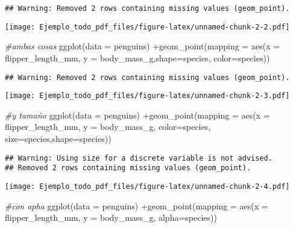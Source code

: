 \documentclass[
]{article}
\newenvironment{Shaded}{\begin{snugshade}}{\end{snugshade}}
\newcommand{\AttributeTok}[1]{\textcolor[rgb]{0.77,0.63,0.00}{#1}}
\newcommand{\CommentTok}[1]{\textcolor[rgb]{0.56,0.35,0.01}{\textit{#1}}}
\newcommand{\FunctionTok}[1]{\textcolor[rgb]{0.00,0.00,0.00}{#1}}
\newcommand{\NormalTok}[1]{#1}
\newcommand{\SpecialCharTok}[1]{\textcolor[rgb]{0.00,0.00,0.00}{#1}}
\begin{document}
\begin{verbatim}
## Warning: Removed 2 rows containing missing values (geom_point).
\end{verbatim}

\texttt{[image: Ejemplo\_todo\_pdf\_files/figure-latex/unnamed-chunk-2-2.pdf]}

\begin{Shaded}
\begin{Highlighting}[]
\CommentTok{\#ambas cosas}
\FunctionTok{ggplot}\NormalTok{(}\AttributeTok{data =}\NormalTok{ penguins) }\SpecialCharTok{+}\FunctionTok{geom\_point}\NormalTok{(}\AttributeTok{mapping =} \FunctionTok{aes}\NormalTok{(}\AttributeTok{x =}\NormalTok{ flipper\_length\_mm, }\AttributeTok{y =}
\NormalTok{                                                    body\_mass\_g,}\AttributeTok{shape=}\NormalTok{species, }\AttributeTok{color=}\NormalTok{species))}
\end{Highlighting}
\end{Shaded}

\begin{verbatim}
## Warning: Removed 2 rows containing missing values (geom_point).
\end{verbatim}

\texttt{[image: Ejemplo\_todo\_pdf\_files/figure-latex/unnamed-chunk-2-3.pdf]}

\begin{Shaded}
\begin{Highlighting}[]
\CommentTok{\#y tamaño}
\FunctionTok{ggplot}\NormalTok{(}\AttributeTok{data =}\NormalTok{ penguins) }\SpecialCharTok{+}\FunctionTok{geom\_point}\NormalTok{(}\AttributeTok{mapping =} \FunctionTok{aes}\NormalTok{(}\AttributeTok{x =}\NormalTok{ flipper\_length\_mm, }\AttributeTok{y =}
\NormalTok{                                                    body\_mass\_g, }\AttributeTok{color=}\NormalTok{species, }\AttributeTok{size=}\NormalTok{species,}\AttributeTok{shape=}\NormalTok{species))}
\end{Highlighting}
\end{Shaded}

\begin{verbatim}
## Warning: Using size for a discrete variable is not advised.
## Removed 2 rows containing missing values (geom_point).
\end{verbatim}

\texttt{[image: Ejemplo\_todo\_pdf\_files/figure-latex/unnamed-chunk-2-4.pdf]}

\begin{Shaded}
\begin{Highlighting}[]
\CommentTok{\#con apha}
\FunctionTok{ggplot}\NormalTok{(}\AttributeTok{data =}\NormalTok{ penguins) }\SpecialCharTok{+}\FunctionTok{geom\_point}\NormalTok{(}\AttributeTok{mapping =} \FunctionTok{aes}\NormalTok{(}\AttributeTok{x =}\NormalTok{ flipper\_length\_mm, }\AttributeTok{y =}
\NormalTok{                                                    body\_mass\_g, }\AttributeTok{alpha=}\NormalTok{species))}
\end{Highlighting}
\end{Shaded}
\end{document}
